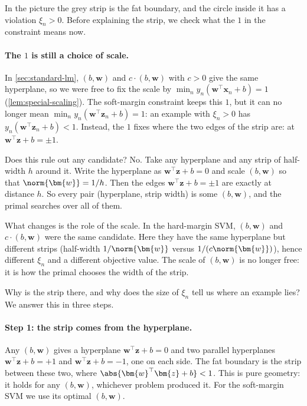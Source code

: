 In the picture the grey strip is the fat boundary, and the circle inside it
has a violation \(\xi_n > 0\). Before explaining the strip, we check what
the \(1\) in the constraint means now.

\paragraph{The \(1\) is still a choice of scale.} In
\autoref{sec:standard-lm}, \((b, \bm{w})\) and \(c \cdot (b, \bm{w})\) with
\(c > 0\) give the same hyperplane, so we were free to fix the scale by
\(\min_n y_n (\bm{w}^\top \bm{x}_n + b) = 1\) (\autoref{lem:special-scaling}).
The soft-margin constraint keeps this \(1\), but it can no longer mean
\(\min_n y_n (\bm{w}^\top \bm{z}_n + b) = 1\): an example with \(\xi_n > 0\)
has \(y_n (\bm{w}^\top \bm{z}_n + b) < 1\). Instead, the \(1\) fixes where
the two edges of the strip are: at \(\bm{w}^\top \bm{z} + b = \pm 1\).

Does this rule out any candidate? No. Take any hyperplane and any strip of
half-width \(h\) around it. Write the hyperplane as \(\bm{w}^\top \bm{z} + b
= 0\) and scale \((b, \bm{w})\) so that \(\norm{\bm{w}} = 1/h\). Then the
edges \(\bm{w}^\top \bm{z} + b = \pm 1\) are exactly at distance \(h\). So
every pair (hyperplane, strip width) is some \((b, \bm{w})\), and the primal
searches over all of them.

What changes is the role of the scale. In the hard-margin SVM, \((b,
\bm{w})\) and \(c \cdot (b, \bm{w})\) were the same candidate. Here they
have the same hyperplane but different strips (half-width \(1 /
\norm{\bm{w}}\) versus \(1 / (c \norm{\bm{w}})\)), hence different
\(\xi_n\) and a different objective value. The scale of \((b, \bm{w})\) is
no longer free: it is how the primal chooses the width of the strip.

Why is the strip there, and why does the size of \(\xi_n\) tell us where an
example lies? We answer this in three steps.

\paragraph{Step 1: the strip comes from the hyperplane.} Any \((b,
\bm{w})\) gives a hyperplane \(\bm{w}^\top \bm{z} + b = 0\) and two parallel
hyperplanes \(\bm{w}^\top \bm{z} + b = +1\) and \(\bm{w}^\top \bm{z} + b =
-1\), one on each side. The fat boundary is the strip between these two,
where \(\abs{\bm{w}^\top \bm{z} + b} < 1\). This is pure geometry: it holds
for any \((b, \bm{w})\), whichever problem produced it. For the soft-margin
SVM we use its optimal \((b, \bm{w})\).

